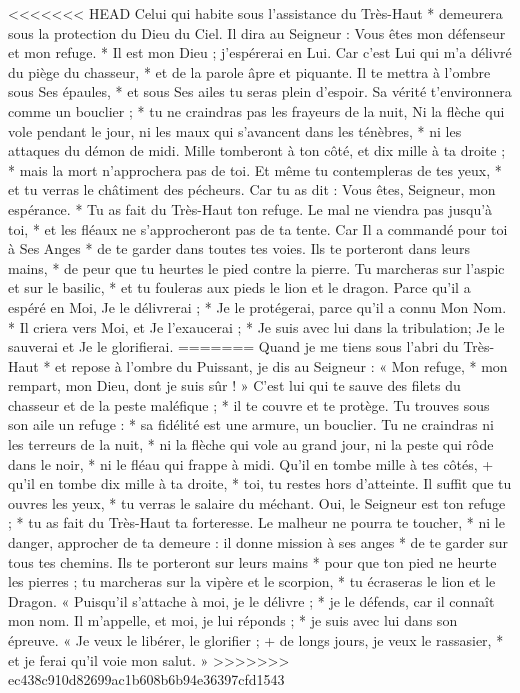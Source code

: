 <<<<<<< HEAD
Celui qui habite sous l'assistance du Très-Haut * demeurera sous la protection du Dieu du Ciel.
\versseparator
Il dira au Seigneur : Vous êtes mon défenseur et mon refuge. * Il est mon Dieu ; j'espérerai en Lui.
\versseparator
Car c'est Lui qui m'a délivré du piège du chasseur, * et de la parole âpre et piquante.
\versseparator
Il te mettra à l'ombre sous Ses épaules, * et sous Ses ailes tu seras plein d'espoir.
\versseparator
Sa vérité t'environnera comme un bouclier ; * tu ne craindras pas les frayeurs de la nuit,
\versseparator
Ni la flèche qui vole pendant le jour, ni les maux qui s'avancent dans les ténèbres, * ni les attaques du démon de midi.
\versseparator
Mille tomberont à ton côté, et dix mille à ta droite ; * mais la mort n'approchera pas de toi.
\versseparator
Et même tu contempleras de tes yeux, * et tu verras le châtiment des pécheurs.
\versseparator
Car tu as dit : Vous êtes, Seigneur, mon espérance. * Tu as fait du Très-Haut ton refuge.
\versseparator
Le mal ne viendra pas jusqu'à toi, * et les fléaux ne s'approcheront pas de ta tente.
\versseparator
Car Il a commandé pour toi à Ses Anges * de te garder dans toutes tes voies.
\versseparator
Ils te porteront dans leurs mains, * de peur que tu heurtes le pied contre la pierre.
\versseparator
Tu marcheras sur l'aspic et sur le basilic, * et tu fouleras aux pieds le lion et le dragon.
\versseparator
Parce qu'il a espéré en Moi, Je le délivrerai ; * Je le protégerai, parce qu'il a connu Mon Nom. *
\versseparator
Il criera vers Moi, et Je l'exaucerai ; * Je suis avec lui dans la tribulation; Je le sauverai et Je le glorifierai.
=======
Quand je me tiens sous l'abri du Très-Haut *
et repose à l'ombre du Puissant,
\versseparator
je dis au Seigneur : « Mon refuge, *
mon rempart, mon Dieu, dont je suis sûr ! »
\versseparator
C'est lui qui te sauve des filets du chasseur
et de la peste maléfique ; *
il te couvre et te protège.
\versseparator
Tu trouves sous son aile un refuge : *
sa fidélité est une armure, un bouclier.
\versseparator
Tu ne craindras ni les terreurs de la nuit, *
ni la flèche qui vole au grand jour,
\versseparator
ni la peste qui rôde dans le noir, *
ni le fléau qui frappe à midi.
\versseparator
Qu'il en tombe mille à tes côtés, +
qu'il en tombe dix mille à ta droite, *
toi, tu restes hors d'atteinte.
\versseparator
Il suffit que tu ouvres les yeux, *
tu verras le salaire du méchant.
\versseparator
Oui, le Seigneur est ton refuge ; *
tu as fait du Très-Haut ta forteresse.
\versseparator
Le malheur ne pourra te toucher, *
ni le danger, approcher de ta demeure :
\versseparator
il donne mission à ses anges *
de te garder sur tous tes chemins.
\versseparator
Ils te porteront sur leurs mains *
pour que ton pied ne heurte les pierres ;
\versseparator
tu marcheras sur la vipère et le scorpion, *
tu écraseras le lion et le Dragon.
\versseparator
« Puisqu'il s'attache à moi, je le délivre ; *
je le défends, car il connaît mon nom.
\versseparator
Il m'appelle, et moi, je lui réponds ; *
je suis avec lui dans son épreuve.
\versseparator
« Je veux le libérer, le glorifier ; +
de longs jours, je veux le rassasier, *
et je ferai qu'il voie mon salut. »
>>>>>>> ec438c910d82699ac1b608b6b94e36397cfd1543
